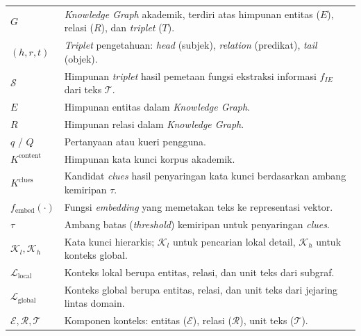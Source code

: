 \documentclass{SkripsiUnesa}
\begin{document}
\DaftarIsi
\DaftarTabel
\DaftarGambar
\DaftarSimbol
\begin{longtable}{p{} p{}}
    $G$                                     & \textit{Knowledge Graph} akademik, terdiri atas himpunan entitas ($E$), relasi ($R$), dan \textit{triplet} ($T$).   \\
    $(h, r, t)$                             & \textit{Triplet} pengetahuan: \textit{head} (subjek), \textit{relation} (predikat), \textit{tail} (objek).          \\
    $\mathcal{S}$                           & Himpunan \textit{triplet} hasil pemetaan fungsi ekstraksi informasi $f_{IE}$ dari teks $\mathcal{T}$.               \\
    $E$                                     & Himpunan entitas dalam \textit{Knowledge Graph}.                                                                    \\
    $R$                                     & Himpunan relasi dalam \textit{Knowledge Graph}.                                                                     \\

    $q$ / $Q$                               & Pertanyaan atau kueri pengguna.                                                                                     \\
    $K^{\text{content}}$                    & Himpunan kata kunci korpus akademik.                                                                                \\
    $K^{\text{clues}}$                      & Kandidat \textit{clues} hasil penyaringan kata kunci berdasarkan ambang kemiripan $\tau$.                           \\
    $f_{\text{embed}}(\cdot)$               & Fungsi \textit{embedding} yang memetakan teks ke representasi vektor.                                               \\
    $\tau$                                  & Ambang batas (\textit{threshold}) kemiripan untuk penyaringan \textit{clues}.                                       \\
    $\mathcal{K}_l, \mathcal{K}_h$          & Kata kunci hierarkis; $\mathcal{K}_l$ untuk pencarian lokal detail, $\mathcal{K}_h$ untuk konteks global.           \\
    $\mathcal{L}_{\text{local}}$            & Konteks lokal berupa entitas, relasi, dan unit teks dari subgraf.                                                   \\
    $\mathcal{L}_{\text{global}}$           & Konteks global berupa entitas, relasi, dan unit teks dari jejaring lintas domain.                                   \\
    $\mathcal{E}, \mathcal{R}, \mathcal{T}$ & Komponen konteks: entitas ($\mathcal{E}$), relasi ($\mathcal{R}$), unit teks ($\mathcal{T}$).                       \\


\end{longtable}
\end{document}
